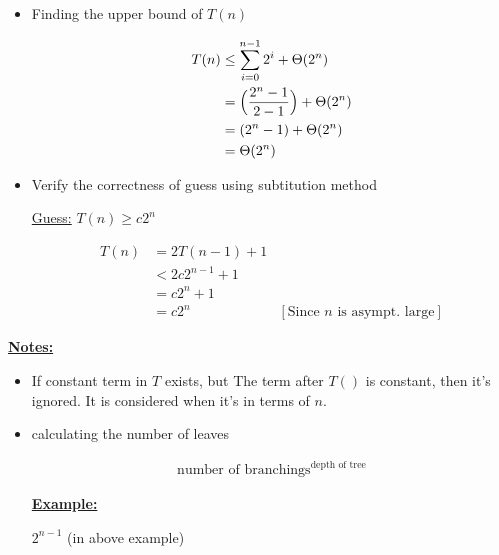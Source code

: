 \documentclass[12pt]{article}
\begin{document}
\begin{enumerate}[1.]
\begin{itemize}
        \bigskip

        \item Finding the upper bound of $T(n)$

        \begin{align}
            T(n) &\leq \sum\limits_{i=0}^{n-1} 2^i + \Theta(2^n)\\
            &= \Bigl( \frac{2^n - 1}{2 - 1} \Bigr) + \Theta(2^n)\\
            &= (2^n - 1) + \Theta(2^n)\\
            &= \Theta(2^n)
        \end{align}

        \item Verify the correctness of guess using subtitution method

        \bigskip

        \underline{Guess:} $T(n) \geq c2^n$

        \bigskip

        \begin{align}
            T(n) &= 2T(n - 1) + 1\\
            &< 2c 2^{n-1} + 1\\
            &= c2^n + 1\\
            &= c2^n & [\text{Since $n$ is asympt. large}]
        \end{align}

    \end{itemize}

    \bigskip

    \underline{\textbf{Notes:}}

    \bigskip

    \begin{itemize}
        \item If constant term in $T$ exists, but The term after $T()$ is constant,
        then it's ignored. It is considered when it's in terms of $n$.

        \item calculating the number of leaves

        \bigskip

        \begin{align}
            \text{number of branchings}^{\text{depth of tree}}
        \end{align}

        \bigskip

        \underline{\textbf{Example:}}

        $2^{n-1}$ (in above example)
    \end{itemize}

\end{enumerate}
\end{document}
